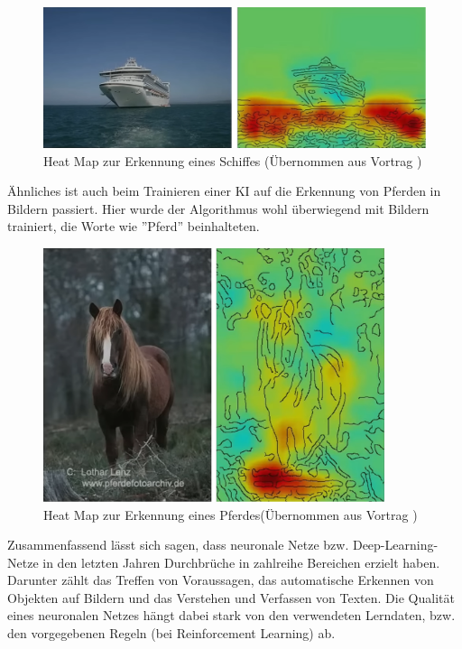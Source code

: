 \documentclass[a4paper,12pt, german]{report}
\begin{document}
\begin{figure}[H]
  \center
 \includegraphics[width=14cm]{images/Schiff-HeatMap.png}
  \caption[Heat Map zur Erkennung eines Schiffes]{Heat Map zur Erkennung eines Schiffes (Übernommen aus Vortrag \cite{16})}
\end{figure}

Ähnliches ist auch beim Trainieren einer KI auf die Erkennung von Pferden in Bildern passiert. Hier wurde der Algorithmus wohl überwiegend mit Bildern trainiert, die Worte wie ''Pferd'' beinhalteten.\cite{16}

\begin{figure}[H]
  \center
 \includegraphics[width=10cm]{images/Pferd-HeatMap.png}
  \caption[Heat Map zur Erkennung eines Pferdes]{Heat Map zur Erkennung eines Pferdes(Übernommen aus Vortrag \cite{16})}
\end{figure}

Zusammenfassend lässt sich sagen, dass neuronale Netze bzw. Deep-Learning-Netze in den letzten Jahren Durchbrüche in zahlreihe Bereichen erzielt haben. Darunter zählt das Treffen von Voraussagen, das automatische Erkennen von Objekten auf Bildern und das Verstehen und Verfassen von Texten. Die Qualität eines neuronalen Netzes hängt dabei stark von den verwendeten Lerndaten, bzw. den vorgegebenen Regeln (bei Reinforcement Learning) ab. 
\end{document}
